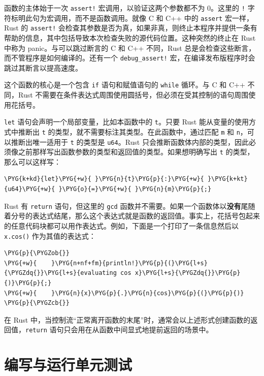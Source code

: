 函数的主体始于一次 \texttt{assert!} 宏调用，以验证这两个参数都不为 0。这里的 \texttt{!} 字符标明此句为宏调用，而不是函数调用。就像 C 和 C++ 中的 \texttt{assert} 宏一样，Rust 的 \texttt{assert!} 会检查其参数是否为真，如果非真，则终止本程序并提供一条有帮助的信息，其中包括导致本次检查失败的源代码位置。这种突然的终止在 Rust 中称为 panic。与可以跳过断言的 C 和 C++ 不同，Rust 总是会检查这些断言，而不管程序是如何编译的。还有一个 \texttt{debug\_assert!} 宏，在编译发布版程序时会跳过其断言以提高速度。

这个函数的核心是一个包含 \texttt{if} 语句和赋值语句的 \texttt{while} 循环。与 C 和 C++ 不同，Rust 不需要在条件表达式周围使用圆括号，但必须在受其控制的语句周围使用花括号。

\texttt{let} 语句会声明一个局部变量，比如本函数中的 \texttt{t}。只要 Rust 能从变量的使用方式中推断出 \texttt{t} 的类型，就不需要标注其类型。在此函数中，通过匹配 \texttt{m} 和 \texttt{n}，可以推断出唯一适用于 \texttt{t} 的类型是 \texttt{u64}。Rust 只会推断函数体内部的类型，因此必须像之前那样写出函数参数的类型和返回值的类型。如果想明确写出 \texttt{t} 的类型，那么可以这样写：

\begin{Verbatim}[commandchars=\\\{\},breaklines=true,breakanywhere=true,fontsize=\codefont,xleftmargin=17bp]
\PYG{k+kd}{let}\PYG{+w}{ }\PYG{n}{t}\PYG{p}{:}\PYG{+w}{ }\PYG{k+kt}{u64}\PYG{+w}{ }\PYG{o}{=}\PYG{+w}{ }\PYG{n}{m}\PYG{p}{;}
\end{Verbatim}

Rust 有 \texttt{return} 语句，但这里的 \texttt{gcd} 函数并不需要。如果一个函数体以\textbf{没有}尾随着分号的表达式结尾，那么这个表达式就是函数的返回值。事实上，花括号包起来的任意代码块都可以用作表达式。例如，下面是一个打印了一条信息然后以 \texttt{x.cos()} 作为其值的表达式：

\begin{Verbatim}[commandchars=\\\{\},breaklines=true,breakanywhere=true,fontsize=\codefont,xleftmargin=17bp]
\PYG{p}{\PYGZob{}}
\PYG{+w}{    }\PYG{n+nf+fm}{println!}\PYG{p}{(}\PYG{l+s}{\PYGZdq{}}\PYG{l+s}{evaluating cos x}\PYG{l+s}{\PYGZdq{}}\PYG{p}{)}\PYG{p}{;}
\PYG{+w}{    }\PYG{n}{x}\PYG{p}{.}\PYG{n}{cos}\PYG{p}{(}\PYG{p}{)}
\PYG{p}{\PYGZcb{}}
\end{Verbatim}

在 Rust 中，当控制流“正常离开函数的末尾”时，通常会以上述形式创建函数的返回值，\texttt{return} 语句只会用在从函数中间显式地提前返回的场景中。

\section{编写与运行单元测试}

